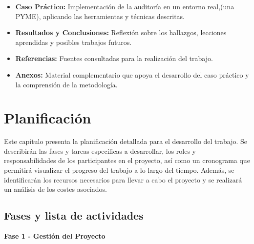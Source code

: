 \documentclass[a4paper, 11pt]{article}
\begin{document}
\begin{itemize}
    \item \textbf{Caso Práctico:} Implementación de la auditoría en un entorno real,(una PYME), aplicando las herramientas y técnicas descritas.
        
    \item \textbf{Resultados y Conclusiones:} Reflexión sobre los hallazgos, lecciones aprendidas y posibles trabajos futuros.
    
    \item \textbf{Referencias:} Fuentes consultadas para la realización del trabajo.
    
    \item \textbf{Anexos:}  Material complementario que apoya el desarrollo del caso práctico y la comprensión de la metodología.

\end{itemize}




\clearpage

\section{Planificación}
\thispagestyle{nohead}
Este capítulo presenta la planificación detallada para el desarrollo del trabajo. Se describirán las fases y tareas específicas a desarrollar, los roles y responsabilidades de los participantes en el proyecto, así como un cronograma que permitirá visualizar el progreso del trabajo a lo largo del tiempo. Además, se identificarán los recursos necesarios para llevar a cabo el proyecto y se realizará un análisis de los costes asociados.


\subsection{Fases y lista de actividades}

\textbf{\large Fase 1 - Gestión del Proyecto} 
\end{document}
